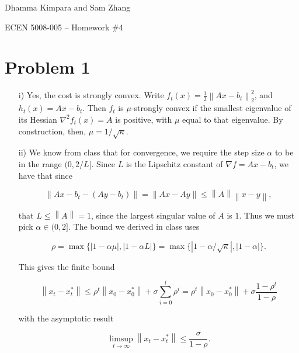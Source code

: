 \documentclass[12pt]{article}
\newcommand{\abs}[1]{\left\lvert#1\right\rvert}
\newcommand{\norm}[1]{\left\lVert#1\right\rVert}
\begin{document}
\begin{flushright}
    Dhamma Kimpara and Sam Zhang

    ECEN 5008-005 -- Homework \#4
\end{flushright}

\section*{Problem 1}%
\label{sec:Problem 1}

\begin{enumerate}
    \item [i)] Yes, the cost is strongly convex. Write $f_t(x) = \frac{1}{2}\norm{Ax - b_t}_2^2$, and $h_t(x) = Ax - b_t$. Then $f_t$ is $\mu$-strongly convex if the smallest eigenvalue of its Hessian $\nabla^2 f_t(x) = A$ is positive, with $\mu$ equal to that eigenvalue. By construction, then, $\mu = 1/\sqrt{\kappa}$.

    \item[ii)] We know from class that for convergence, we require the step size $\alpha$ to be in the range $(0, 2/L]$. Since $L$ is the Lipschitz constant of $\nabla f = Ax - b_t$, we have that since

        \begin{equation*}
            \norm{Ax - b_t - (Ay - b_t)} = \norm{Ax - Ay} \le \norm{A} \norm{x - y},
        \end{equation*}

        that $L \le \norm{A} = 1$, since the largest singular value of $A$ is $1$. Thus we must pick $\alpha \in (0, 2]$. The bound we derived in class uses 

        \begin{equation*}
            \rho = \max \lbrace \abs{ 1 - \alpha \mu}, \abs{ 1 - \alpha L } \rbrace = \max \lbrace \abs{ 1 - \alpha/\sqrt{\kappa}}, \abs{ 1 - \alpha } \rbrace.
        \end{equation*}

        This gives the finite bound

        \begin{equation}
            \label{eq:bounds}
            \norm{x_t - x_t^*} \le \rho^t \norm{x_0 - x_0^*} + \sigma \sum_{i=0}^t \rho^i = \rho^t \norm{x_0 - x_0^*} + \sigma \frac{1 - \rho^{t}}{1-\rho}
        \end{equation}

        with the asymptotic result

        \begin{equation*}
            \limsup_{t \to \infty} \norm{x_t - x_t^*} \le \frac{\sigma}{1 - \rho}.
        \end{equation*}


\end{enumerate}
\end{document}
